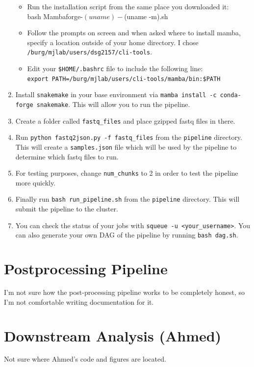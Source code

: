 \documentclass{article}
\begin{document}
\begin{enumerate}
\begin{itemize}
                \item Run the installation script from the same place you downloaded it: \\
                bash Mambaforge-$(uname)-$(uname -m).sh
                \item Follow the prompts on screen and when asked where to install mamba, specify a location outside of your home directory. I chose \texttt{/burg/mjlab/users/dsg2157/cli-tools}.
                \item Edit your \texttt{\$HOME/.bashrc} file to include the following line: \\
                \texttt{export PATH=/burg/mjlab/users/cli-tools/mamba/bin:\$PATH}
            \end{itemize}
        \item Install \texttt{snakemake} in your base environment via \texttt{mamba install -c conda-forge snakemake}. This will allow you to run the pipeline.
        \item Create a folder called \texttt{fastq\_files} and place gzipped fastq files in there.
        \item Run \texttt{python fastq2json.py -f fastq\_files} from the \texttt{pipeline} directory. This will create a \texttt{samples.json} file which will be used by the pipeline to determine which fastq files to run.
        \item For testing purposes, change \texttt{num\_chunks} to 2 in order to test the pipeline more quickly. 
        \item Finally run \texttt{bash run\_pipeline.sh} from the \texttt{pipeline} directory. This will submit the pipeline to the cluster. 
        \item You can check the status of your jobs with \texttt{squeue -u <your\_username>}. You can also generate your own DAG of the pipeline by running \texttt{bash dag.sh}.
    \end{enumerate}

    \section{Postprocessing Pipeline}
    I'm not sure how the post-processing pipeline works to be completely honest, so I'm not comfortable writing documentation for it.

    \section{Downstream Analysis (Ahmed)}
    Not sure where Ahmed's code and figures are located.
\end{document}
